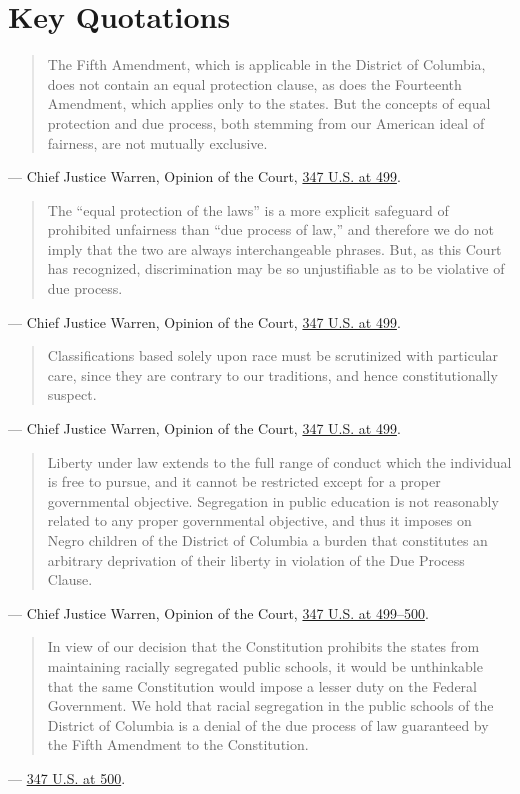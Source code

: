 \documentclass[12pt]{article}
\begin{document}
\section{Key Quotations}

\begin{quote}
The Fifth Amendment, which is applicable in the District of Columbia, does not contain an equal protection clause, as does the Fourteenth Amendment, which applies only to the states. But the concepts of equal protection and due process, both stemming from our American ideal of fairness, are not mutually exclusive.
\end{quote}
\noindent --- Chief Justice Warren, Opinion of the Court, \href{https://supreme.justia.com/cases/federal/us/347/497/}{347 U.S. at 499}.

\begin{quote}
The ``equal protection of the laws'' is a more explicit safeguard of prohibited unfairness than ``due process of law,'' and therefore we do not imply that the two are always interchangeable phrases. But, as this Court has recognized, discrimination may be so unjustifiable as to be violative of due process.
\end{quote}
\noindent --- Chief Justice Warren, Opinion of the Court, \href{https://supreme.justia.com/cases/federal/us/347/497/}{347 U.S. at 499}.

\begin{quote}
Classifications based solely upon race must be scrutinized with particular care, since they are contrary to our traditions, and hence constitutionally suspect.
\end{quote}
\noindent --- Chief Justice Warren, Opinion of the Court, \href{https://supreme.justia.com/cases/federal/us/347/497/}{347 U.S. at 499}.

\begin{quote}
Liberty under law extends to the full range of conduct which the individual is free to pursue, and it cannot be restricted except for a proper governmental objective. Segregation in public education is not reasonably related to any proper governmental objective, and thus it imposes on Negro children of the District of Columbia a burden that constitutes an arbitrary deprivation of their liberty in violation of the Due Process Clause.
\end{quote}
\noindent --- Chief Justice Warren, Opinion of the Court, \href{https://supreme.justia.com/cases/federal/us/347/497/}{347 U.S. at 499--500}.

\begin{quote}
In view of our decision that the Constitution prohibits the states from maintaining racially segregated public schools, it would be unthinkable that the same Constitution would impose a lesser duty on the Federal Government. We hold that racial segregation in the public schools of the District of Columbia is a denial of the due process of law guaranteed by the Fifth Amendment to the Constitution.
\end{quote}
\noindent --- \href{https://www.courtlistener.com/opinion/105222/bolling-v-sharpe/}{347 U.S. at 500}.
\end{document}
